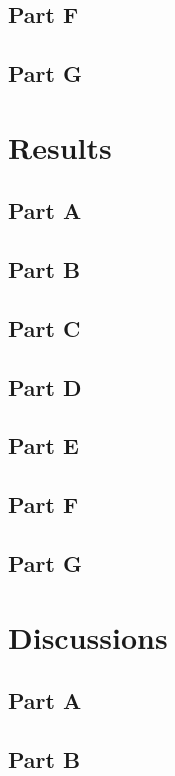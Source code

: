 \documentclass[a4paper, 11pt]{article}
\begin{document}
\subsection{Part F}
\subsection{Part G}

\pagebreak

\section{Results}

\subsection{Part A}
\subsection{Part B}
\subsection{Part C}
\subsection{Part D}
\subsection{Part E}
\subsection{Part F}
\subsection{Part G}

\pagebreak

\section{Discussions}

\subsection{Part A}
\subsection{Part B}
\end{document}
